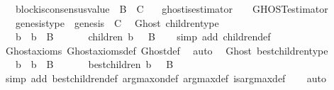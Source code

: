 \begin{isabellebody}
\ \ \ block{\isacharunderscore}is{\isacharunderscore}consensus{\isacharunderscore}value\ {\isacharcolon}\ {\isachardoublequoteopen}B\ {\isacharequal}\ C{\isachardoublequoteclose}\isanewline
\ \ \ ghost{\isacharunderscore}is{\isacharunderscore}estimator\ {\isacharcolon}\ {\isachardoublequoteopen}{\isasymepsilon}\ {\isacharequal}\ GHOST{\isacharunderscore}estimator{\isachardoublequoteclose}\isanewline
\ \ \ genesis{\isacharunderscore}type\ {\isacharcolon}\ {\isachardoublequoteopen}genesis\ {\isasymin}\ C{\isachardoublequoteclose}\isanewline
\isanewline
{}\isamarkupfalse%
\ {\isacharparenleft}\ Ghost{\isacharparenright}\ children{\isacharunderscore}type\ {\isacharcolon}\isanewline
\ \ {\isachardoublequoteopen}{\isasymforall}\ b\ {\isasymsigma}{\isachardot}\ b\ {\isasymin}\ B\ {\isasymand}\ {\isasymsigma}\ {\isasymin}\ {\isasymSigma}\ {\isasymlongrightarrow}\ \ children\ {\isacharparenleft}b{\isacharcomma}\ {\isasymsigma}{\isacharparenright}\ {\isasymsubseteq}\ B{\isachardoublequoteclose}\isanewline
%
\isadelimproof
\ \ %
\endisadelimproof
%
\isatagproof
{}\isamarkupfalse%
\ {\isacharparenleft}simp\ add{\isacharcolon}\ children{\isacharunderscore}def{\isacharparenright}\isanewline
\ \ \isamarkupfalse%
\ Ghost{\isacharunderscore}axioms\ Ghost{\isacharunderscore}axioms{\isacharunderscore}def\ Ghost{\isacharunderscore}def\ \isamarkupfalse%
\ auto%
\endisatagproof
{\isafoldproof}%
%
\isadelimproof
\isanewline
%
\endisadelimproof
\isanewline
{}\isamarkupfalse%
\ {\isacharparenleft}\ Ghost{\isacharparenright}\ best{\isacharunderscore}children{\isacharunderscore}type\ {\isacharcolon}\isanewline
\ \ {\isachardoublequoteopen}{\isasymforall}\ b\ {\isasymsigma}{\isachardot}\ b\ {\isasymin}\ B\ {\isasymand}\ {\isasymsigma}\ {\isasymin}\ {\isasymSigma}\ {\isasymlongrightarrow}\ \ best{\isacharunderscore}children\ {\isacharparenleft}b{\isacharcomma}\ {\isasymsigma}{\isacharparenright}\ {\isasymsubseteq}\ B{\isachardoublequoteclose}\isanewline
%
\isadelimproof
\ \ %
\endisadelimproof
%
\isatagproof
{}\isamarkupfalse%
\ {\isacharparenleft}simp\ add{\isacharcolon}\ best{\isacharunderscore}children{\isacharunderscore}def\ arg{\isacharunderscore}max{\isacharunderscore}on{\isacharunderscore}def\ arg{\isacharunderscore}max{\isacharunderscore}def\ is{\isacharunderscore}arg{\isacharunderscore}max{\isacharunderscore}def{\isacharparenright}\isanewline
\ \ \isamarkupfalse%
\ auto\ \isanewline
\ \ \isamarkupfalse%

\end{isabellebody}

